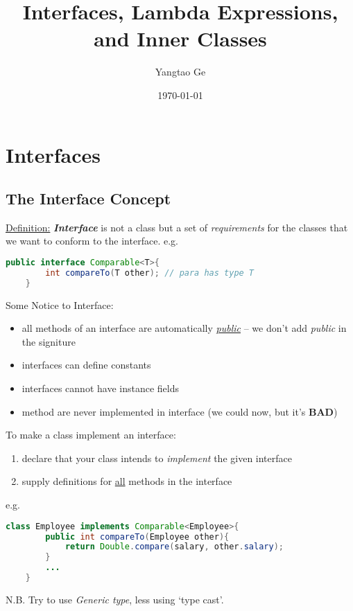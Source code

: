 \documentclass[12pt]{article}
\title{Interfaces, Lambda Expressions, and Inner Classes}
\author{Yangtao Ge}
\date{\today}
\begin{document}
\maketitle

\section{Interfaces}
\subsection{The Interface Concept}
\underline{Definition:} \emph{\textbf{Interface}} is not a class but a set of \emph{requirements} for the classes
that we want to conform to the interface. \newline
e.g.
\begin{lstlisting}[language=Java]
    public interface Comparable<T>{
        int compareTo(T other); // para has type T
    }
\end{lstlisting}

Some Notice to Interface:
\begin{itemize}
    \item all methods of an interface are automatically \underline{\textit{public}} -- we don't add \emph{public} in the signiture
    \item interfaces can define constants
    \item interfaces cannot have instance fields
    \item method are never implemented in interface (we could now, but it's \textbf{BAD})
\end{itemize}

To make a class implement an interface:
\begin{enumerate}
    \item declare that your class intends to \emph{implement} the given interface
    \item supply definitions for \underline{all} methods in the interface
\end{enumerate}
e.g.
\begin{lstlisting}[language=Java]
    class Employee implements Comparable<Employee>{
        public int compareTo(Employee other){
            return Double.compare(salary, other.salary);
        }
        ... 
    }
\end{lstlisting}
N.B. Try to use \emph{Generic type}, less using `type cast'.
\end{document}
